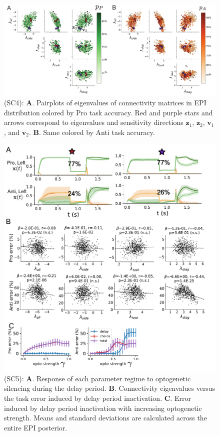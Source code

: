 \documentclass[11pt]{article}
\begin{document}
\begin{figure}
\begin{center}
\includegraphics[scale=0.8]{figures/figSC4/figSC4.pdf}
\end{center}
\caption{\small (SC4):  \textbf{A}. Pairplots of eigenvalues of connectivity matrices in EPI distribution colored by Pro task accuracy.  Red and purple stars and arrows correspond to eigenvalues and sensitivity directions $\mathbf{z}_1$, $\mathbf{z}_2$, $\mathbf{v}_1$, and $\mathbf{v}_2$. \textbf{B}. Same colored by Anti task accuracy.
}
\label{fig:SC4}
\end{figure}

\begin{figure}
\begin{center}
\includegraphics[scale=0.8]{figures/figSC5/figSC5.pdf}
\end{center}
\caption{\small (SC5): 
\textbf{A}. Response of each parameter regime to optogenetic silencing during the delay period.
\textbf{B}. Connectivity eigenvalues versus the task error induced by delay period inactivation.
\textbf{C}. Error induced by delay period inactivation with increasing optogenetic strength.  Means and standard deviations are calculated across the entire EPI posterior.
}
\label{fig:SC5}
\end{figure}
\end{document}
